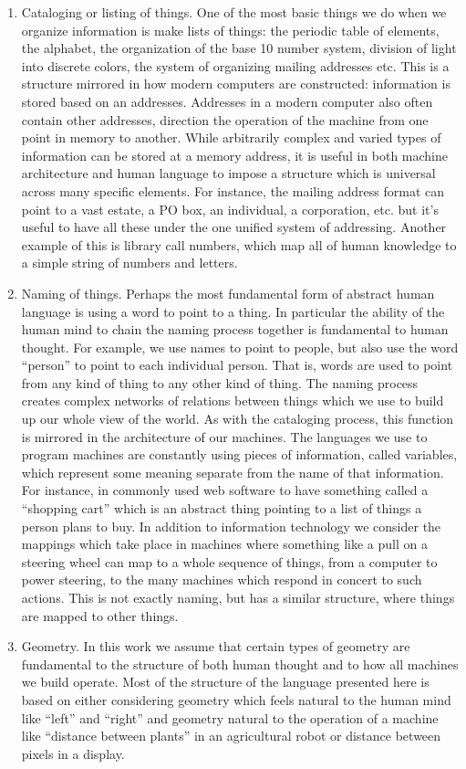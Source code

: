 \documentclass[12pt,a4paper]{amsart}
\numberwithin{equation}{section}
\begin{document}
\begin{enumerate}
\def\labelenumi{\arabic{enumi}.}
\item
  Cataloging or listing of things. One of the most basic things we do
  when we organize information is make lists of things: the periodic
  table of elements, the alphabet, the organization of the base 10
  number system, division of light into discrete colors, the system of
  organizing mailing addresses etc. This is a structure mirrored in how
  modern computers are constructed: information is stored based on an
  addresses. Addresses in a modern computer also often contain other
  addresses, direction the operation of the machine from one point in
  memory to another. While arbitrarily complex and varied types of
  information can be stored at a memory address, it is useful in both
  machine architecture and human language to impose a structure which is
  universal across many specific elements. For instance, the mailing
  address format can point to a vast estate, a PO box, an individual, a
  corporation, etc. but it's useful to have all these under the one
  unified system of addressing. Another example of this is library call
  numbers, which map all of human knowledge to a simple string of
  numbers and letters.
\item
  Naming of things. Perhaps the most fundamental form of abstract human
  language is using a word to point to a thing. In particular the
  ability of the human mind to chain the naming process together is
  fundamental to human thought. For example, we use names to point to
  people, but also use the word ``person'' to point to each individual
  person. That is, words are used to point from any kind of thing to any
  other kind of thing. The naming process creates complex networks of
  relations between things which we use to build up our whole view of
  the world. As with the cataloging process, this function is mirrored
  in the architecture of our machines. The languages we use to program
  machines are constantly using pieces of information, called variables,
  which represent some meaning separate from the name of that
  information. For instance, in commonly used web software to have
  something called a ``shopping cart'' which is an abstract thing
  pointing to a list of things a person plans to buy. In addition to
  information technology we consider the mappings which take place in
  machines where something like a pull on a steering wheel can map to a
  whole sequence of things, from a computer to power steering, to the
  many machines which respond in concert to such actions. This is not
  exactly naming, but has a similar structure, where things are mapped
  to other things.
\item
  Geometry. In this work we assume that certain types of geometry are
  fundamental to the structure of both human thought and to how all
  machines we build operate. Most of the structure of the language
  presented here is based on either considering geometry which feels
  natural to the human mind like ``left'' and ``right'' and geometry
  natural to the operation of a machine like ``distance between plants''
  in an agricultural robot or distance between pixels in a display.
\end{enumerate}
\end{document}
